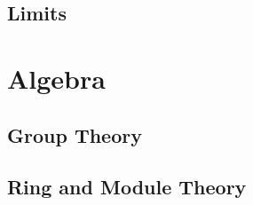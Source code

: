 \chapter{Limits}



\part{Algebra}


% 
% 
% 
% 
% 
% 
% 
% 


% 
% 
% 
% 
% 

\chapter{Group Theory}






\chapter{Ring and Module Theory}







